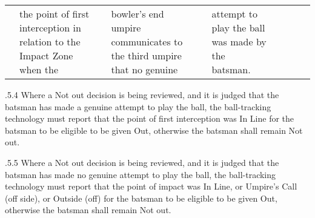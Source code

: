 \documentclass[12pt]{article}
\begin{document}
\begin{table}[H]
\begin{tabular}{p{0.65in}p{0.65in}p{0.65in}p{0.65in}p{0.65in}p{0.65in}p{0.65in}p{0.65in}p{0.65in}p{0.65in}}
\hhline{~~}
\multicolumn{1}{p{0.65in}}{} & 
\multicolumn{1}{p{0.65in}}{{\fontsize{9pt}{10.8pt}\selectfont the point of first interception in relation to the Impact Zone when the}} & 

\hhline{~~}
\multicolumn{1}{p{0.65in}}{} & 
\multicolumn{1}{p{0.65in}}{{\fontsize{9pt}{10.8pt}\selectfont bowler’s end umpire communicates to the third umpire that no genuine}} & 

\hhline{~~}
\multicolumn{1}{p{0.65in}}{} & 
\multicolumn{1}{p{0.65in}}{{\fontsize{9pt}{10.8pt}\selectfont attempt to play the ball was made by the batsman.}} & 

\hhline{~~}
\multicolumn{1}{p{0.65in}}{} & 
\multicolumn{1}{p{0.65in}}{} & 

\hhline{~~}

\end{tabular}
 \end{table}




\vspace{\baselineskip}
\begin{adjustwidth}{1.18in}{0.25in}
{\fontsize{9pt}{10.8pt}.5.4 \tabto{1.17in} Where a Not out decision is being reviewed, and it is judged that the batsman has made a genuine attempt to play the ball, the ball-tracking technology must report that the point of first interception was In Line for the batsman to be eligible to be given Out, otherwise the batsman shall remain Not out.\par}\par

\end{adjustwidth}


\vspace{\baselineskip}
\begin{adjustwidth}{1.18in}{0.11in}
{\fontsize{9pt}{10.8pt}.5.5 \tabto{1.17in} Where a Not out decision is being reviewed, and it is judged that the batsman has made no genuine attempt to play the ball, the ball-tracking technology must report that the point of impact was In Line, or Umpire’s Call (off side), or Outside (off) for the batsman to be eligible to be given Out, otherwise the batsman shall remain Not out.\par}\par

\end{adjustwidth}
\end{document}
